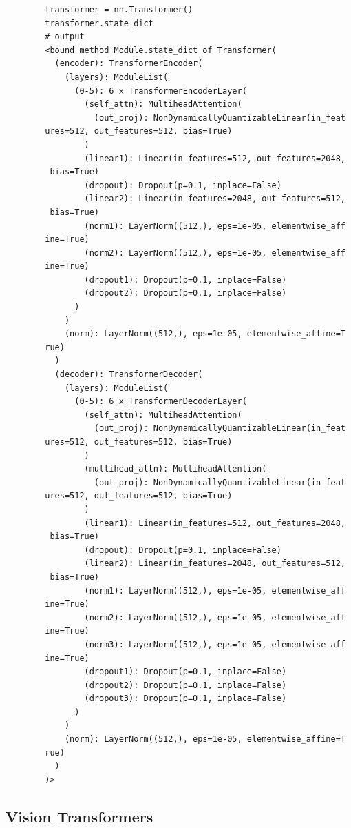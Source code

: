       \begin{lstlisting}
        transformer = nn.Transformer()
        transformer.state_dict
        # output 
        <bound method Module.state_dict of Transformer(
          (encoder): TransformerEncoder(
            (layers): ModuleList(
              (0-5): 6 x TransformerEncoderLayer(
                (self_attn): MultiheadAttention(
                  (out_proj): NonDynamicallyQuantizableLinear(in_feat
        ures=512, out_features=512, bias=True)
                )
                (linear1): Linear(in_features=512, out_features=2048,
         bias=True)
                (dropout): Dropout(p=0.1, inplace=False)
                (linear2): Linear(in_features=2048, out_features=512,
         bias=True)
                (norm1): LayerNorm((512,), eps=1e-05, elementwise_aff
        ine=True)
                (norm2): LayerNorm((512,), eps=1e-05, elementwise_aff
        ine=True)
                (dropout1): Dropout(p=0.1, inplace=False)
                (dropout2): Dropout(p=0.1, inplace=False)
              )
            )
            (norm): LayerNorm((512,), eps=1e-05, elementwise_affine=T
        rue)
          )
          (decoder): TransformerDecoder(
            (layers): ModuleList(
              (0-5): 6 x TransformerDecoderLayer(
                (self_attn): MultiheadAttention(
                  (out_proj): NonDynamicallyQuantizableLinear(in_feat
        ures=512, out_features=512, bias=True)
                )
                (multihead_attn): MultiheadAttention(
                  (out_proj): NonDynamicallyQuantizableLinear(in_feat
        ures=512, out_features=512, bias=True)
                )
                (linear1): Linear(in_features=512, out_features=2048,
         bias=True)
                (dropout): Dropout(p=0.1, inplace=False)
                (linear2): Linear(in_features=2048, out_features=512,
         bias=True)
                (norm1): LayerNorm((512,), eps=1e-05, elementwise_aff
        ine=True)
                (norm2): LayerNorm((512,), eps=1e-05, elementwise_aff
        ine=True)
                (norm3): LayerNorm((512,), eps=1e-05, elementwise_aff
        ine=True)
                (dropout1): Dropout(p=0.1, inplace=False)
                (dropout2): Dropout(p=0.1, inplace=False)
                (dropout3): Dropout(p=0.1, inplace=False)
              )
            )
            (norm): LayerNorm((512,), eps=1e-05, elementwise_affine=T
        rue)
          )
        )>
      \end{lstlisting}

  \subsection{Vision Transformers} 

